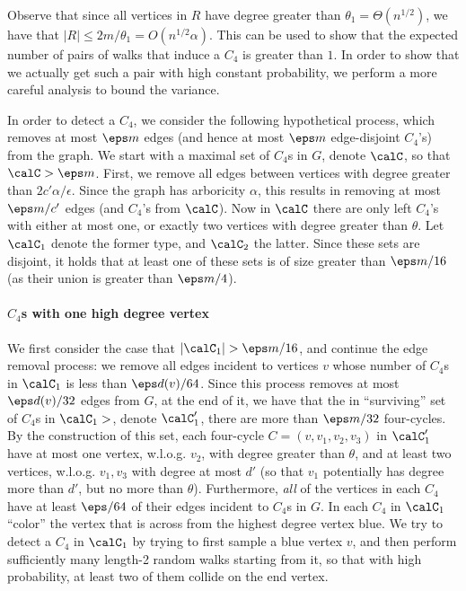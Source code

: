 Observe that since all vertices in $R$ have degree greater than $\theta_1 = \Theta(n^{1/2})$, we have that $|R| \leq 2m/\theta_1 = O(n^{1/2}\alpha)$. This can be used to show that the expected number of pairs of walks that induce a $C_4$ is greater than $1$. In order to show that we actually get such a pair with high constant probability, we perform a more careful analysis to bound the variance. 


\iffalse
In order to detect a $C_4$, we consider the following hypothetical process, which removes at most $\eps m$ edges (and hence at most $\eps m$ edge-disjoint $C_4$'s) from the graph. 
We start with a maximal set of $C_4$s in $G$, denote $\calC$, so that $\calC>\eps m$.
First, we remove all edges between vertices with degree greater than  $2c'\alpha/\epsilon$. Since the graph has arboricity $\alpha$, this results in removing at most $\eps m/c'$ edges (and $C_4$'s from $\calC$).  Now in  $\calC$  there are only left $C_4$'s with either at most one, or exactly two vertices with degree greater than $\theta$.  Let $\calC_1$ denote the former type, and $\calC_2$ the latter. Since these sets are disjoint, it holds that at least one of these sets is of size greater than $\eps m/16$ (as their union is greater than $\eps m/4$).

\paragraph{$C_4$s with one high degree vertex}
We first consider the case that $|\calC_1|>\eps m/16$, and continue the edge removal process: we remove all edges incident to vertices $v$ whose number of $C_4$s in $\calC_1$ is less than $\eps d(v)/64$. Since this process removes at most $\eps d(v)/32$ edges from $G$, at the end of it, we have that the in  ``surviving'' set of $C_4$s in $\calC_1>$, denote $\calC_1'$, there are more than $\eps m/32$ four-cycles. By the construction of this set, each four-cycle $C=(v,v_1, v_2, v_3)$ in $\calC_1'$ 
have at most one vertex, w.l.o.g. $v_2$,  with degree greater than  $\theta$, and at least two vertices, w.l.o.g. $v_1,v_3$ with degree at most $d'$ (so that $v_1$ potentially has degree more than $d'$, but no more than $\theta$).
Furthermore,  \emph{all} of the vertices in each $C_4$ have at least $\eps/64$ of their edges incident to $C_4$s in $G$.  In each $C_4$  in $\calC_1$ ``color'' the vertex that is across from the highest degree vertex blue. 
We try to detect a $C_4$ in $\calC_1$ by trying to first  sample  a blue vertex $v$, and then perform sufficiently many length-2 random walks starting from it, so that with high probability, at least two of them collide on the end vertex. 

